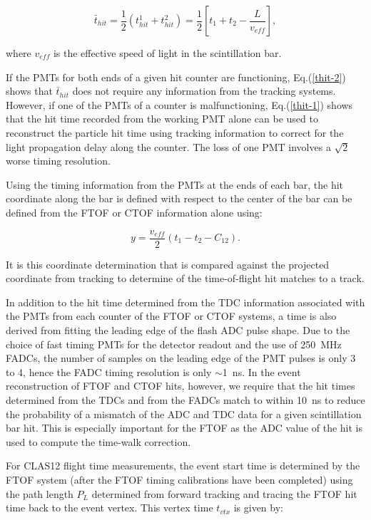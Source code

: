 \begin{equation}
\label{thit-2}
\bar{t}_{hit} = \frac{1}{2} ( t_{hit}^1 + t_{hit}^2 ) = \frac{1}{2} \left[ t_1 + t_2 - \frac{L}{v_{eff}} \right],
\end{equation}

\noindent
where $v_{eff}$ is the effective speed of light in the scintillation bar.

If the PMTs for both ends of a given hit counter are functioning, Eq.(\ref{thit-2}) shows that $\bar{t}_{hit}$
does not require any information from the tracking systems. However, if one of the PMTs of a counter is
malfunctioning, Eq.(\ref{thit-1}) shows that the hit time recorded from the working PMT alone can be
used to reconstruct the particle hit time using tracking information to correct for the light propagation delay
along the counter. The loss of one PMT involves a $\sqrt{2}$ worse timing resolution.

Using the timing information from the PMTs at the ends of each bar, the hit coordinate along the bar is defined
with respect to the center of the bar can be defined from the FTOF or CTOF information alone using:

\begin{equation}
\label{tof-coor}
y = \frac{v_{eff}}{2} (t_1 - t_2 - C_{12}).
\end{equation}

\noindent
It is this coordinate determination that is compared against the projected coordinate from tracking to
determine of the time-of-flight hit matches to a track.

In addition to the hit time determined from the TDC information associated with the PMTs from each counter
of the FTOF or CTOF systems, a time is also derived from fitting the leading edge of the flash ADC pulse
shape. Due to the choice of fast timing PMTs for the detector readout and the use of 250~MHz FADCs, the
number of samples on the leading edge of the PMT pulses is only 3 to 4, hence the FADC timing resolution is only
$\sim$1~ns. In the event reconstruction of FTOF and CTOF hits, however, we require that the hit times
determined from the TDCs and from the FADCs match to within 10~ns to reduce the probability of a mismatch
of the ADC and TDC data for a given scintillation bar hit. This is especially important for the FTOF as the ADC
value of the hit is used to compute the time-walk correction.

For CLAS12 flight time measurements, the event start time is determined by the FTOF system (after the
FTOF timing calibrations have been completed) using the path length $P_L$ determined from forward tracking
and tracing the FTOF hit time back to the event vertex. This vertex time $t_{vtx}$ is given by:


